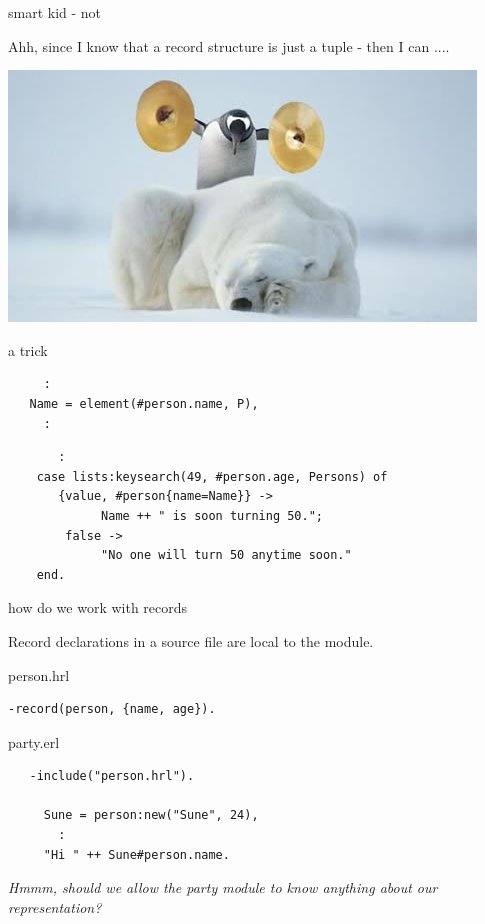 \begin{frame}{smart kid - not}

\begin{center}
Ahh, since I know that a record structure is just a tuple - then I can ....
\end{center}

\pause\vspace{20pt}
\begin{center}
   \includegraphics[width=0.5\linewidth]{badidea.jpg}
\end{center} 

\end{frame}

\begin{frame}[fragile]{a trick}

\begin{verbatim}
     :
   Name = element(#person.name, P),
     :
\end{verbatim}

\pause 
\begin{verbatim}
       :
    case lists:keysearch(49, #person.age, Persons) of
       {value, #person{name=Name}} -> 
             Name ++ " is soon turning 50.";
        false ->
             "No one will turn 50 anytime soon."
    end.
\end{verbatim}

\end{frame}

\begin{frame}[fragile]{how do we work with records}

Record declarations in a source file are local to the module.
\begin{block}{person.hrl}
\begin{verbatim}
-record(person, {name, age}).
\end{verbatim}
\end{block}

\pause
\begin{block}{party.erl}
\begin{verbatim}
   -include("person.hrl").

     Sune = person:new("Sune", 24),
       :
     "Hi " ++ Sune#person.name.

\end{verbatim}
\end{block}

{\em Hmmm, should we allow the party module to know anything about our representation?}
\end{frame}


